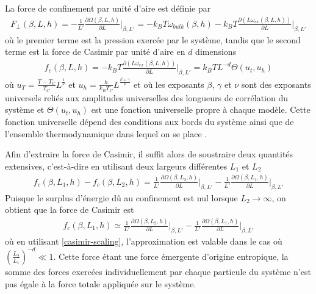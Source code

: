 La force de confinement par unité d'aire est définie par 
\begin{align}
    F_\perp(\beta,L,h) = - \frac{1}{L' }\frac{\partial \Omega(\beta,L,h)}{\partial L} \bigg|_{\beta,L'} = - k_B T \omega_{bulk}(\beta,h) - k_B T \frac{\partial(L \omega_{ex}(\beta,L,h))}{\partial L}\bigg|_{\beta,L'}
\end{align}
où le premier terme est la pression exercée par le système, tandis que le second terme est la force de Casimir par unité d'aire \cite{vasilyev_critical_2013} en $d$ dimensions 
\begin{align}
    f_c(\beta,L,h) = - k_B T \frac{\partial(L \omega_{ex}(\beta,L,h))}{\partial L}\bigg|_{\beta,L'} = k_B T L^{-d} \Theta(u_t,u_h)
    \label{casimir-scaling}
\end{align}
où $u_T = \frac{T-T_C}{T_C} L^\frac{1}{\nu}$ et $u_h = \frac{h}{k_B T_C} L^\frac{\beta+\gamma}{\nu}$ et où les exposants $\beta$, $\gamma$ et $\nu$ sont des exposants universels reliés aux amplitudes universelles des longueurs de corrélation du système \cite{pelissetto_critical_2002,vasilyev_critical_2013} et $\Theta(u_t,u_h)$ est une fonction universelle propre à chaque modèle. Cette fonction universelle dépend des conditions aux bords du système \cite{dantchev_casimir_2017,dantchev_exact_2016} ainsi que de l'ensemble thermodynamique dans lequel on se place \cite{gross_critical_2016,rohwer_transient_2017}.

Afin d'extraire la force de Casimir, il suffit alors de soustraire deux quantités extensives, c'est-à-dire en utilisant deux largeurs différentes $L_1$ et $L_2$
\begin{align}
    f_c(\beta,L_1,h) - f_c(\beta,L_2,h) =  \frac{1}{L' }\frac{\partial \Omega(\beta,L_2,h)}{\partial L} \bigg|_{\beta,L'} -  \frac{1}{L' }\frac{\partial \Omega(\beta,L_1,h)}{\partial L} \bigg|_{\beta,L'}
\end{align}
Puisque le surplus d'énergie dû au confinement est nul lorsque $L_2\to \infty$, on obtient que la force de Casimir est
\begin{align}
    f_c(\beta,L_1,h) \simeq \frac{1}{L' }\frac{\partial \Omega(\beta,L_2,h)}{\partial L} \bigg|_{\beta,L'} -  \frac{1}{L' }\frac{\partial \Omega(\beta,L_1,h)}{\partial L} \bigg|_{\beta,L'}
    \label{casimir-diff-omega}   
\end{align}
où en utilisant \ref{casimir-scaling}, l'approximation est valable dans le cas où $ \left( \frac{L_2}{L_1}\right)^{-d} \ll 1 $.  Cette force étant une force émergente d'origine entropique, la somme des forces exercées individuellement par chaque particule du système n'est pas égale à la force totale appliquée sur le système\cite{paladugu_nonadditivity_2016}.

